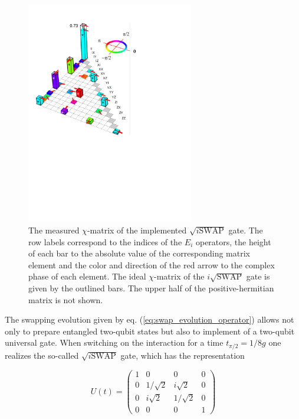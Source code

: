 \begin{figure}
		\includegraphics[width=0.65\textwidth]{./material/papers/iswap/figures/chi_matrix}
	\caption[Measured $\chi$-matrix of the $\sqrt{i\textrm{SWAP}}$ gate]{The measured $\chi$-matrix of the implemented $\sqrt{i\mathrm{SWAP}}$ gate. The row labels correspond to the indices of the $E_i$ operators, the height of each bar to the absolute value of the corresponding matrix element and the color and direction of the red arrow to the complex phase of each element. The ideal $\chi$-matrix of the $i\sqrt{\mathrm{SWAP}}$ gate is given by the outlined bars. The upper half of the positive-hermitian matrix is not shown.}
	\label{fig:gate_chi_matrix_and_errors}
\end{figure}

The swapping evolution given by eq. (\ref{eq:swap_evolution_operator}) allows not only to prepare entangled two-qubit states but also to implement of a two-qubit universal gate. When switching on the interaction for a time $t_{\pi/2} = 1/8g$ one realizes the so-called $\sqrt{i\mathrm{SWAP}}$ gate, which has the representation

\begin{equation}
	U(t)  =  \left( \begin{array}{cccc} 1 & 0 & 0 & 0 \\ 0 & 1/\sqrt{2} & i\sqrt{2} & 0 \\ 0 & i\sqrt{2} & 1/\sqrt{2} & 0 \\ 0 & 0 & 0 & 1 \end{array} \right) \label{eq:sqrt_iswap_gate}
\end{equation}

